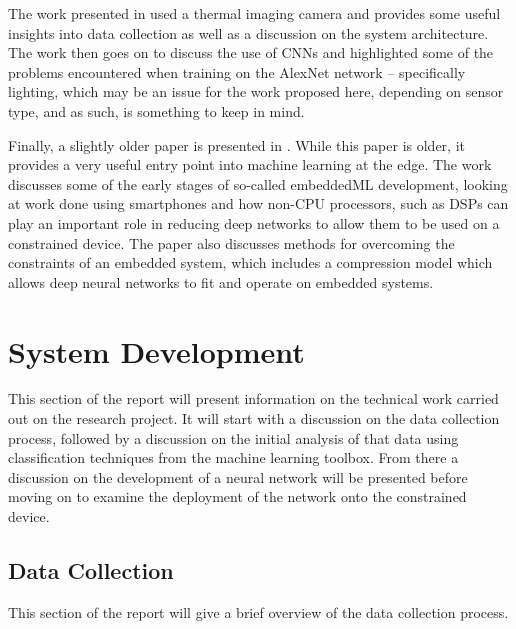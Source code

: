 \documentclass[conference]{IEEEtran}
\begin{document}
The work presented in \cite{quinn} used a thermal imaging camera and provides some useful insights into data collection as well as a discussion on the system architecture. The work then goes on to discuss the use of CNNs and highlighted some of the problems encountered when training on the AlexNet network – specifically lighting, which may be an issue for the work proposed here, depending on sensor type, and as such, is something to keep in mind.


Finally, a slightly older paper is presented in \cite{lane}. While this paper is older, it provides a very useful entry point into machine learning at the edge. The work discusses some of the early stages of so-called embeddedML development, looking at work done using smartphones and how non-CPU processors, such as DSPs can play an important role in reducing deep networks to allow them to be used on a constrained device. The paper also discusses methods for overcoming the constraints of an embedded system, which includes a compression model which allows deep neural networks to fit and operate on embedded systems. 

\section{System Development}
This section of the report will present information on the technical work carried out on the research project. It will start with a discussion on the data collection process, followed by a discussion on the initial analysis of that data using classification techniques from the machine learning toolbox. From there a discussion on the development of a neural network will be presented before moving on to examine the deployment of the network onto the constrained device.

\subsection{Data Collection}
This section of the report will give a brief overview of the data collection process.
\end{document}
